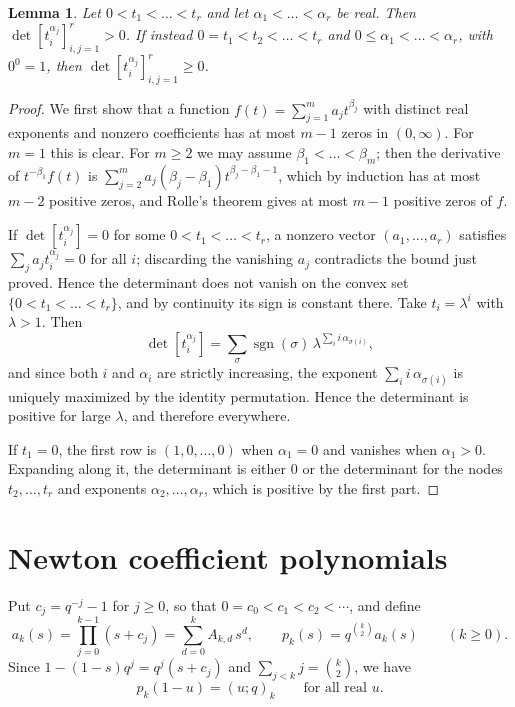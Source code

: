 \documentclass{amsart}
\newtheorem{lemma}[theorem]{Lemma}
\theoremstyle{remark}
\numberwithin{equation}{section}
\begin{document}
\begin{lemma}\label{lem:vandermonde}
Let $0<t_1<\dots<t_r$ and let $\alpha_1<\dots<\alpha_r$ be real. Then $\det[t_i^{\alpha_j}]_{i,j=1}^r>0$. If instead $0=t_1<t_2<\dots<t_r$ and $0\le\alpha_1<\dots<\alpha_r$, with $0^0=1$, then $\det[t_i^{\alpha_j}]_{i,j=1}^r\ge0$.
\end{lemma}

\begin{proof}
We first show that a function $f(t)=\sum_{j=1}^m a_jt^{\beta_j}$ with distinct real exponents and nonzero coefficients has at most $m-1$ zeros in $(0,\infty)$. For $m=1$ this is clear. For $m\ge2$ we may assume $\beta_1<\dots<\beta_m$; then the derivative of $t^{-\beta_1}f(t)$ is $\sum_{j=2}^m a_j(\beta_j-\beta_1)t^{\beta_j-\beta_1-1}$, which by induction has at most $m-2$ positive zeros, and Rolle's theorem gives at most $m-1$ positive zeros of $f$.

If $\det[t_i^{\alpha_j}]=0$ for some $0<t_1<\dots<t_r$, a nonzero vector $(a_1,\dots,a_r)$ satisfies $\sum_j a_jt_i^{\alpha_j}=0$ for all $i$; discarding the vanishing $a_j$ contradicts the bound just proved. Hence the determinant does not vanish on the convex set $\{0<t_1<\dots<t_r\}$, and by continuity its sign is constant there. Take $t_i=\lambda^i$ with $\lambda>1$. Then
\[
\det[t_i^{\alpha_j}]=\sum_{\sigma}\operatorname{sgn}(\sigma)\,\lambda^{\sum_i i\,\alpha_{\sigma(i)}},
\]
and since both $i$ and $\alpha_i$ are strictly increasing, the exponent $\sum_i i\,\alpha_{\sigma(i)}$ is uniquely maximized by the identity permutation. Hence the determinant is positive for large $\lambda$, and therefore everywhere.

If $t_1=0$, the first row is $(1,0,\dots,0)$ when $\alpha_1=0$ and vanishes when $\alpha_1>0$. Expanding along it, the determinant is either $0$ or the determinant for the nodes $t_2,\dots,t_r$ and exponents $\alpha_2,\dots,\alpha_r$, which is positive by the first part.
\end{proof}

\section{Newton coefficient polynomials}\label{sec:newton}

Put $c_j=q^{-j}-1$ for $j\ge0$, so that $0=c_0<c_1<c_2<\cdots$, and define
\[
a_k(s)=\prod_{j=0}^{k-1}(s+c_j)=\sum_{d=0}^{k}A_{k,d}\,s^d,\qquad
p_k(s)=q^{\binom k2}a_k(s)\qquad(k\ge0).
\]
Since $1-(1-s)q^j=q^j(s+c_j)$ and $\sum_{j<k}j=\binom k2$, we have
\begin{equation}\label{eq:pk}
p_k(1-u)=(u;q)_k\qquad\text{for all real }u.
\end{equation}
\end{document}
